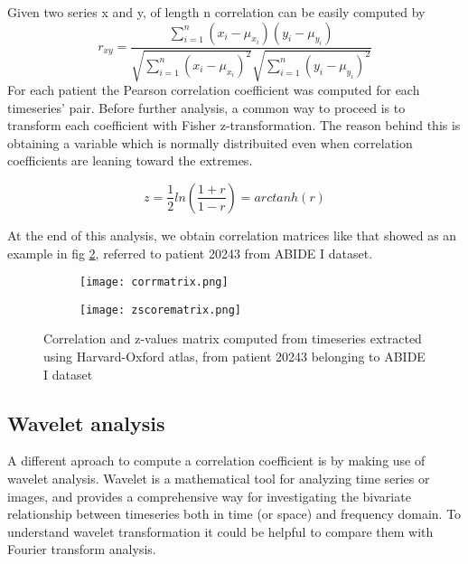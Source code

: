 \documentclass[a4paper,11pt]{article}
\begin{document}
Given two series x and y, of length n correlation can be easily computed by
\begin{equation}
r_{xy} = \frac{\sum_{i = 1}^n \left( x_i - \mu_{x_i}\right)\left( y_i - \mu_{y_i}\right)}{\sqrt{\sum_{i = 1}^n \left( x_i -\mu_{x_i}\right)^2}\sqrt{\sum_{i = 1}^n \left( y_i -\mu_{y_i}\right)^2}}
\end{equation}
For each patient the Pearson correlation coefficient was computed for each timeseries' pair. Before further analysis, a common way to proceed is to transform each coefficient with Fisher z-transformation. The reason behind this is obtaining a variable which is normally distribuited even when correlation coefficients are leaning toward the extremes.

\begin{equation}
z = \frac{1}{2}ln\left(\frac{1+r}{1-r}\right) = arctanh(r)
\end{equation}

At the end of this analysis, we obtain correlation matrices like that showed as an example in fig \ref{fig:corrmatrices}, referred to patient 20243 from ABIDE I dataset.
\begin{figure}
\begin{subfigure}{0.5\textwidth}
\texttt{[image: corrmatrix.png]}
\caption{}
\label{ref:corrmatrix}
\end{subfigure}
\begin{subfigure}{0.5\textwidth}
\texttt{[image: zscorematrix.png]}
\end{subfigure}
\caption{Correlation and z-values matrix computed from timeseries extracted using Harvard-Oxford atlas, from patient 20243 belonging to ABIDE I dataset}
\label{fig:corrmatrices}
\end{figure}



\subsection{Wavelet analysis}
A different aproach to compute a correlation coefficient is by making use of wavelet analysis.
Wavelet is a mathematical tool for analyzing time series or images, and provides a comprehensive way for investigating the bivariate relationship between timeseries both in time (or space) and frequency domain.
To understand wavelet transformation it could be helpful to compare them with Fourier transform analysis.
\end{document}
